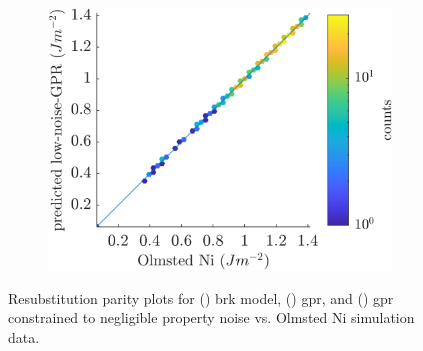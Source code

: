 \documentclass[final,twocolumn,12pt]{elsarticle}
\begin{document}
\begin{figure}[!htb]
\begin{subfigure}[b]{0.32\textwidth}
         \includegraphics[width=\textwidth]{figures/resubloss-ni-low-noise-gpr.png}
         \caption{}
         \label{fig:resubloss-ni-low-noise-gpr}
     \end{subfigure}
        \caption{Resubstitution parity plots for () \gls{brk} model, () \gls{gpr}, and () \gls{gpr} constrained to negligible property noise vs. Olmsted Ni simulation \inpt{} data.}
        \label{fig:resubloss-ni}
\end{figure}
\end{document}
